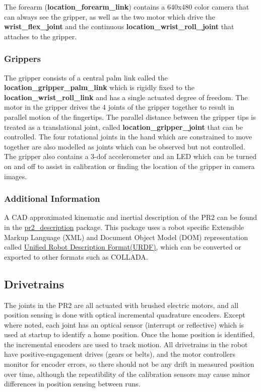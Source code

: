 The forearm ({\bf location\_forearm\_link}) contains a 640x480 color camera that
can always see the gripper, as well as the two motor which drive the {\bf
  wrist\_flex\_joint} and the continuous {\bf location\_wrist\_roll\_joint} that
attaches to the gripper.

\subsubsection{Grippers}
The gripper consists of a central palm link called the {\bf
  location\_gripper\_palm\_link} which is rigidly fixed to the {\bf
  location\_wrist\_roll\_link} and has a single actuated degree of freedom.  The
motor in the gripper drives the 4 joints of the gripper together to result in
parallel motion of the fingertips.  The parallel distance between the gripper
tips is treated as a translational joint, called {\bf location\_gripper\_joint}
that can be controlled.  The four rotational joints in the hand which are
constrained to move together are also modelled as joints which can be observed
but not controlled.  The gripper also contains a 3-dof accelerometer and an LED
which can be turned on and off to assist in calibration or finding the location
of the gripper in camera images.

\subsubsection{Additional Information}
A CAD approximated kinematic and inertial description of the PR2 can be found in
the \href{http://www.ros.org/wiki/pr2\_description}{pr2\_description} package.
This package uses a robot specific Extensible Markup Language (XML) and Document
Object Model (DOM) representation called
\href{http://www.ros.org/wiki/urdf}{Unified Robot Description Format(URDF)}, which can
be converted or exported to other formats such as COLLADA.


\subsection{Drivetrains}
The joints in the PR2 are all actuated with brushed electric motors, and all
position sensing is done with optical incremental quadrature encoders.  Except
where noted, each joint has an optical sensor (interrupt or reflective) which is
used at startup to identify a home position.  Once the home position is
identified, the incremental encoders are used to track motion.  All drivetrains
in the robot have positive-engagement drives (gears or belts), and the motor
controllers monitor for encoder errors, so there should not be any drift in
measured position over time, although the repeatibility of the calibration
sensors may cause minor differences in position sensing between runs.

